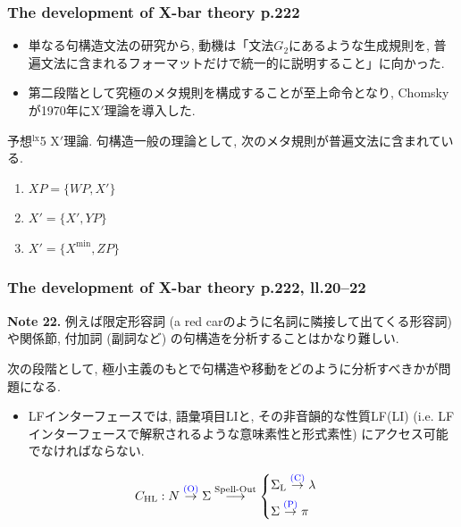\documentclass[dvipdfmx, xcolor={dvipsnames},12pt]{beamer}
\begin{document}
\begin{frame}
\frametitle{The development of X-bar theory p.222}
\begin{itemize}
\item 単なる句構造文法の研究から, 動機は「文法$G_2$にあるような生成規則を, 普遍文法に含まれるフォーマットだけで統一的に説明すること」に向かった.
\item 第二段階として究極のメタ規則を構成することが至上命令となり, Chomskyが1970年にX$'$理論を導入した.
\end{itemize}

\begin{Rem}{予想$^\text{lx}$5 X$'$理論.}
句構造一般の理論として, 次のメタ規則が普遍文法に含まれている.
\begin{enumerate}
  \setlength{\itemsep}{2pt} %
  \item[(i)] $XP = \{WP, X'\}$
  \item[(ii)] $X' = \{X', YP\}$
  \item[(iii)] $X' = \{X^\text{min}, ZP\}$
\end{enumerate}
\end{Rem}
\end{frame}


\begin{frame}
\frametitle{The development of X-bar theory p.222, ll.20--22}

\begin{marker}
\textbf{Note 22.}\; 例えば限定形容詞 (a red carのように名詞に隣接して出てくる形容詞) や関係節, 付加詞 (副詞など) の句構造を分析することはかなり難しい.
\end{marker}

次の段階として, 極小主義のもとで句構造や移動をどのように分析すべきかが問題になる.
\begin{itemize}
\item LFインターフェースでは, 語彙項目LIと, その非音韻的な性質LF(LI) (i.e. LFインターフェースで解釈されるような意味素性と形式素性) にアクセス可能でなければならない. 
\end{itemize}
\[
C_{\mathrm{HL}}:
N  \stackrel{{\color{blue}\text{(O)}}}{\rightarrow} \Sigma 
\stackrel{\text{Spell-Out}}{\longrightarrow}
\begin{cases}
\Sigma_{\mathrm{L}} \stackrel{{\color{blue}\text{(C)}}}{\rightarrow} \lambda  \\[4pt]
\Sigma \stackrel{{\color{blue}\text{(P)}}}{\rightarrow} \pi 
\end{cases}
\]
\end{frame}
\end{document}
